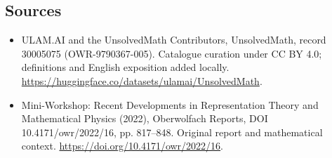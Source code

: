 \documentclass[11pt]{article}
\begin{document}
\subsection{Sources}
\begin{itemize}
\item[\hypertarget{source:30005075:1}{S1}] ULAM.AI and the UnsolvedMath Contributors, UnsolvedMath, record 30005075 (OWR-9790367-005). Catalogue curation under CC BY 4.0; definitions and English exposition added locally.
\url{https://huggingface.co/datasets/ulamai/UnsolvedMath}.
\item[\hypertarget{source:30005075:2}{S2}] Mini-Workshop: Recent Developments in Representation Theory and Mathematical Physics (2022), Oberwolfach Reports, DOI 10.4171/owr/2022/16, pp. 817--848. Original report and mathematical context.
\url{https://doi.org/10.4171/owr/2022/16}.
\end{itemize}
\label{end:30005075}
\end{document}
